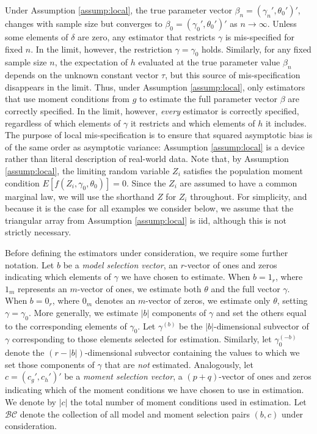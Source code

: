 Under Assumption \ref{assump:local}, the true parameter vector $\beta_n = \left(\gamma_n', \theta_0' \right)'$, changes with sample size but converges to $\beta_0 = \left(\gamma_0', \theta_0'\right)'$ as $n\rightarrow \infty$. 
Unless some elements of $\delta$ are zero, any estimator that restricts $\gamma$ is mis-specified for fixed $n$. 
In the limit, however, the restriction $\gamma = \gamma_0$ holds. 
Similarly, for any fixed sample size $n$, the expectation of $h$ evaluated at the true parameter value $\beta_n$ depends on the unknown constant vector $\tau$, but this source of mis-specification disappears in the limit. 
Thus, under Assumption \ref{assump:local}, only estimators that use moment conditions from $g$ to estimate the full parameter vector $\beta$ are correctly specified. 
In the limit, however, \emph{every} estimator is correctly specified, regardless of which elements of $\gamma$ it restricts and which elements of $h$ it includes. 
The purpose of local mis-specification is to ensure that squared asymptotic bias is of the same order as asymptotic variance: Assumption \ref{assump:local} is a device rather than literal description of real-world data. 
Note that, by Assumption \ref{assump:local}, the limiting random variable $Z_i$ satisfies the population moment condition $E[f\left(Z_i,\gamma_0, \theta_0\right)]=0$. 
Since the $Z_i$ are assumed to have a common marginal law, we will use the shorthand $Z$ for $Z_i$ throughout.
For simplicity, and because it is the case for all examples we consider below, we assume that the triangular array from Assumption \ref{assump:local} is iid, although this is not strictly necessary.

Before defining the estimators under consideration, we require some further notation. Let $b$ be a \emph{model selection vector}, an $r$-vector of ones and zeros indicating which elements of $\gamma$ we have chosen to estimate. 
When $b = 1_r$, where $1_m$ represents an $m$-vector of ones, we estimate both $\theta$ and the full vector $\gamma$. 
When $b = 0_r$, where $0_m$ denotes an $m$-vector of zeros, we estimate only $\theta$, setting $\gamma=\gamma_0$. 
More generally, we estimate $|b|$ components of $\gamma$ and set the others equal to the corresponding elements of $\gamma_0$. 
Let $\gamma^{(b)}$ be the $|b|$-dimensional subvector of $\gamma$ corresponding to those elements selected for estimation. 
Similarly, let $\gamma^{(-b)}_0$ denote the $(r-|b|)$-dimensional subvector containing the values to which we set those components of $\gamma$ that are \emph{not} estimated.
Analogously, let $c=\left(c_g', c_h'\right)'$ be a \emph{moment selection vector}, a $(p+q)$-vector of ones and zeros indicating which of the moment conditions we have chosen to use in estimation. 
We denote by $|c|$ the total number of moment conditions used in estimation. 
Let $\mathcal{BC}$ denote the collection of all model and moment selection pairs $(b,c)$ under consideration.


